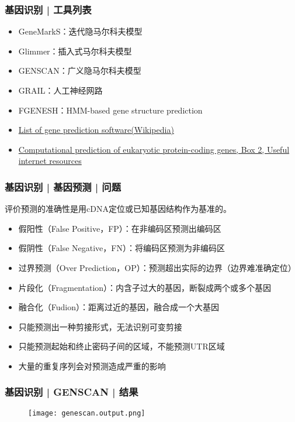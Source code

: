 \begin{frame}
  \frametitle{基因识别 | 工具列表}
  \begin{itemize}
    \item GeneMarkS：迭代隐马尔科夫模型
    \item Glimmer：插入式马尔科夫模型
    \item GENSCAN：广义隐马尔科夫模型
    \item GRAIL：人工神经网路
    \item FGENESH：HMM-based gene structure prediction
    \item \href{http://en.wikipedia.org/wiki/List\_of\_gene\_prediction\_software}{List of gene prediction software(Wikipedia)}
    \item \href{http://www.nature.com/nrg/journal/v3/n9/box/nrg890\_BX2.html}{Computational prediction of eukaryotic protein-coding genes, Box 2, Useful internet resources}
  \end{itemize}
\end{frame}

\begin{frame}
  \frametitle{基因识别 | 基因预测 | 问题}
  评价预测的准确性是用cDNA定位或已知基因结构作为基准的。
  \begin{itemize}
    \item 假阳性（False Positive，FP）：在非编码区预测出编码区
    \item 假阴性（False Negative，FN）：将编码区预测为非编码区
    \item 过界预测（Over Prediction，OP）：预测超出实际的边界（边界难准确定位）
    \item 片段化（Fragmentation）：内含子过大的基因，断裂成两个或多个基因
    \item 融合化（Fudion）：距离过近的基因，融合成一个大基因
    \item 只能预测出一种剪接形式，无法识别可变剪接
    \item 只能预测起始和终止密码子间的区域，不能预测UTR区域
    \item 大量的重复序列会对预测造成严重的影响
  \end{itemize}
\end{frame}

\begin{frame}
  \frametitle{基因识别 | GENSCAN | 结果}
  \begin{figure}
    \centering
    \texttt{[image: genescan.output.png]}
  \end{figure}
\end{frame}

